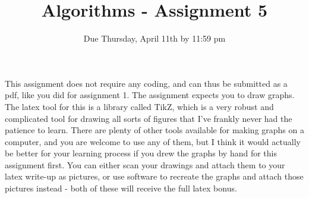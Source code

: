 \documentclass[12pt]{article}
\title{Algorithms - Assignment 5}
\date{Due Thursday, April 11th by 11:59 pm}
\begin{document}
\maketitle
This assignment does not require any coding, and can thus be submitted as a pdf, like you did for assignment 1. The assignment expects you to draw graphs. The latex tool for this is a library called TikZ, which is a very robust and complicated tool for drawing all sorts of figures that I've frankly never had the patience to learn. There are plenty of other tools available for making graphs on a computer, and you are welcome to use any of them, but I think it would actually be better for your learning process if you drew the graphs by hand for this assignment first. You can either scan your drawings and attach them to your latex write-up as pictures, or use software to recreate the graphs and attach those pictures instead - both of these will receive the full latex bonus. 
\end{document}
